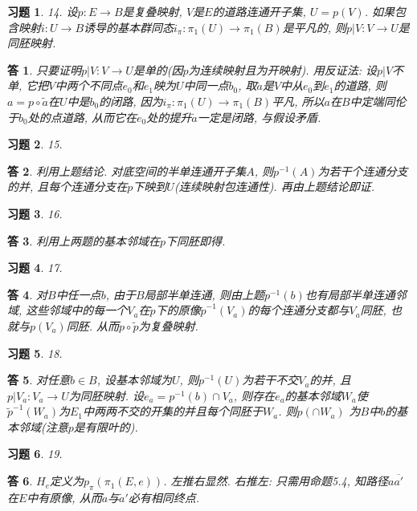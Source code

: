 \documentclass{ctexart}%
\newtheorem*{exercise}{习题}
\newtheorem*{solution}{答}
\theoremstyle{definition}
\theoremstyle{remark}
\begin{document}
\begin{exercise}14. 设$p:E\rightarrow B$是复叠映射, $V$是$E$的道路连通开子集, $U=p(V)$. 如果包含映射$i:U\rightarrow B$诱导的基本群同态$i_\pi:\pi_1(U)\rightarrow \pi_1(B)$是平凡的, 则$p|V:V\rightarrow U$是同胚映射.
\end{exercise}
\begin{solution}
只要证明$p|V:V\rightarrow U$是单的(因$p$为连续映射且为开映射). 用反证法: 设$p|V$不单, 它把$V$中两个不同点$e_0$和$e_1$映为$U$中同一点$b_0$, 取$\tilde{a}$是$V$中从$e_0$到$e_1$的道路, 则$a=p\circ \tilde{a}$在$U$中是$b_0$的闭路, 因为$i_\pi:\pi_1(U)\rightarrow \pi_1(B)$平凡, 所以$a$在$B$中定端同伦于$b_0$处的点道路, 从而它在$e_0$处的提升$\tilde{a}$一定是闭路, 与假设矛盾. 
\end{solution}

\begin{exercise}15.
\end{exercise}
\begin{solution}
利用上题结论. 对底空间的半单连通开子集$A$, 则$p^{-1}(A)$为若干个连通分支的并, 且每个连通分支在$p$下映到$U$(连续映射包连通性).  再由上题结论即证.
\end{solution}

\begin{exercise}16.
\end{exercise}
\begin{solution}
利用上两题的基本邻域在$p$下同胚即得.
\end{solution}

\begin{exercise}17.
\end{exercise}
\begin{solution}
对$B$中任一点$b$, 由于$B$局部半单连通, 则由上题$p^{-1}(b)$也有局部半单连通邻域, 这些邻域中的每一个$V_a$在$\tilde{p}$下的原像$\tilde{p}^{-1}(V_a)$的每个连通分支都与$V_a$同胚, 也就与$p(V_a)$同胚. 从而$p\circ \tilde{p}$为复叠映射.
\end{solution}

\begin{exercise}18.
\end{exercise}
\begin{solution}
对任意$b\in B$, 设基本邻域为$U$, 则$p^{-1}(U)$为若干不交$V_a$的并, 且$p|V_a:V_a\rightarrow U$为同胚映射. 设$e_a=p^{-1}(b)\cap V_a$, 则存在$e_a$的基本邻域$W_a$使$\tilde{p}^{-1}(W_a)$为$E_1$中两两不交的开集的并且每个同胚于$W_a$. 则$p(\cap W_a)$ 为$B$中$b$的基本邻域(注意$p$是有限叶的).
\end{solution}

\begin{exercise}19.
\end{exercise}
\begin{solution}
$H_e$定义为$p_\pi(\pi_1(E,e))$. 左推右显然. 右推左: 只需用命题5.4, 知路径$a\overline{a'}$在$E$中有原像, 从而$\tilde{a}$与$\tilde{a}'$必有相同终点.
\end{solution}
\end{document}
